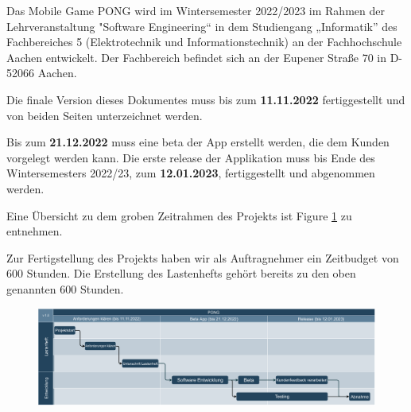 
Das Mobile Game PONG wird im Wintersemester 2022/2023 im Rahmen der Lehrveranstaltung
"Software Engineering“ in dem Studiengang „Informatik” des Fachbereiches 5 (Elektrotechnik und
Informationstechnik) an der Fachhochschule Aachen entwickelt.
Der Fachbereich befindet sich an der Eupener Straße 70 in D-52066 Aachen.

Die finale Version dieses Dokumentes muss bis zum \textbf{11.11.2022} fertiggestellt und
von beiden Seiten unterzeichnet werden.

Bis zum \textbf{21.12.2022} muss eine \gls{beta} der App erstellt werden, die dem Kunden
vorgelegt werden kann. 
Die erste \gls{release} der Applikation muss bis Ende
des Wintersemesters 2022/23, zum \textbf{12.01.2023}, fertiggestellt und abgenommen werden.

Eine Übersicht zu dem groben Zeitrahmen des Projekts ist Figure \ref{fig:dia:zeitplan} zu entnehmen.

Zur Fertigstellung des Projekts haben wir als Auftragnehmer ein Zeitbudget von 600 Stunden. 
Die Erstellung des Lastenhefts gehört bereits zu den oben genannten 600 Stunden.


\begin{figure}[h!]
    \includegraphics[width=\textwidth]{pdfs/ZeitlicherAblauf.pdf}
    \label{fig:dia:zeitplan}
\end{figure}

